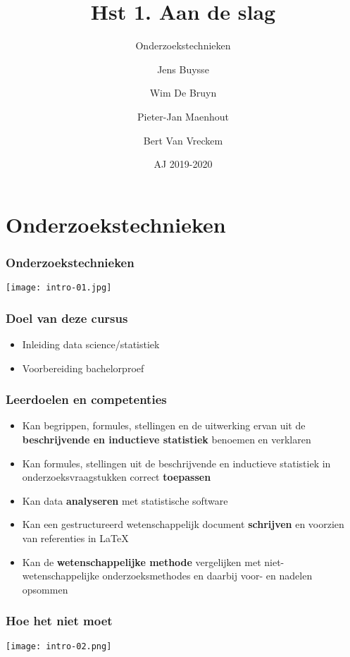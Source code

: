 \documentclass[aspectratio=169]{beamer}
\title[OZT: aan de slag]{Hst 1. Aan de slag}
\subtitle{Onderzoekstechnieken}
\author{Jens Buysse \and Wim {De Bruyn} \and Pieter-Jan Maenhout \and Bert {Van Vreckem}}
\date{AJ 2019-2020}
\begin{document}
\begin{frame}
  \maketitle
\end{frame}

\section{Onderzoekstechnieken}

\begin{frame}
  \frametitle{Onderzoekstechnieken}
  
  \centering
  \texttt{[image: intro-01.jpg]}
\end{frame}

\begin{frame}
  \frametitle{Doel van deze cursus}
  
  \begin{itemize}
    \item Inleiding data science/statistiek
    \item Voorbereiding bachelorproef
  \end{itemize}
\end{frame}

\begin{frame}
  \frametitle{Leerdoelen en competenties}
  
  \begin{itemize}
    \item Kan begrippen, formules, stellingen en de uitwerking ervan uit de \textbf{beschrijvende en inductieve statistiek} benoemen en verklaren
    \item Kan formules, stellingen uit de beschrijvende en inductieve statistiek in onderzoeksvraagstukken correct \textbf{toepassen}
    \item Kan data \textbf{analyseren} met statistische software
    \item Kan een gestructureerd wetenschappelijk document \textbf{schrijven} en voorzien van referenties in \LaTeX{}
    \item Kan de \textbf{wetenschappelijke methode} vergelijken met niet-wetenschappelijke onderzoeksmethodes en daarbij voor- en nadelen opsommen 
  \end{itemize}
\end{frame}

\begin{frame}
  \frametitle{Hoe het niet moet}
  
  \centering
  \texttt{[image: intro-02.png]}
\end{frame}
\end{document}
